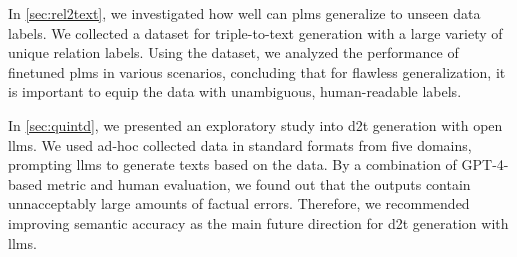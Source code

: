 In \autoref{sec:rel2text}, we investigated how well can \acp{plm} generalize to unseen data labels. We collected a dataset for triple-to-text generation with a large variety of unique relation labels. Using the dataset, we analyzed the performance of finetuned \acp{plm} in various scenarios, concluding that for flawless generalization, it is important to equip the data with unambiguous, human-readable labels.


In \autoref{sec:quintd}, we presented an exploratory study into \ac{d2t} generation with open \acp{llm}. We used ad-hoc collected data in standard formats from five domains, prompting \acp{llm} to generate texts based on the data. By a combination of GPT-4-based metric and human evaluation, we found out that the outputs contain unnacceptably large amounts of factual errors. Therefore, we recommended improving semantic accuracy as the main future direction for \ac{d2t} generation with \acp{llm}.





